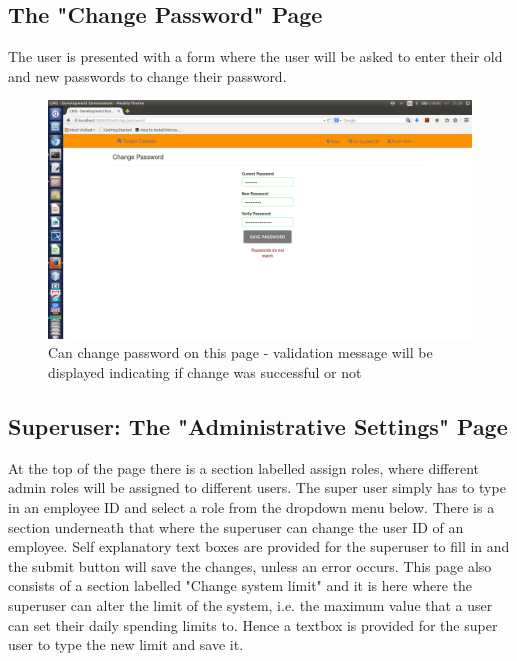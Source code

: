 \documentclass[a4paper,12pt]{report}
\begin{document}
\subsection{The "Change Password" Page} 
The user is presented with a form where the user will be asked to enter their old and new passwords to change their password. 

\begin{figure}[H]
  \centering
    \includegraphics[width=1.0\textwidth]{screenshots/changePassDontMatch.png}
    \caption{Can change password on this page - validation message will be displayed indicating if change was successful or not} 
\end{figure}

\subsection{Superuser: The "Administrative Settings" Page} 
At the top of the page there is a section labelled assign roles, where different admin roles will be assigned to different users. The super user simply has to type in an employee ID and select a role from the dropdown menu below. There is a section underneath that where the superuser can change the user ID of an employee. Self explanatory text boxes are provided for the superuser to fill in and the submit button will save the changes, unless an error occurs.  This page also consists of a section labelled "Change system limit" and it is here where the superuser can alter the limit of the system, i.e. the maximum value that a user can set their daily spending limits to. Hence a textbox is provided for the super user to type the new limit and save it.
\end{document}
